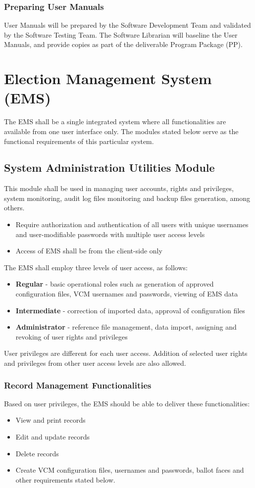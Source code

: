 \documentclass[a4paper, 11pt]{article}
\begin{document}
\subsubsection{Preparing User Manuals}
User Manuals will be prepared by the Software Development Team and validated by the Software Testing Team. The Software Librarian will baseline the User Manuals, and provide copies as part of the deliverable Program Package (PP).

\section{Election Management System (EMS)}\label{ems}
The EMS shall be a single integrated system where all functionalities are available from one user interface only. The modules stated below serve as the functional requirements of this particular system.
\subsection{System Administration Utilities Module}
This module shall be used in managing user accounts, rights and privileges, system monitoring, audit log files monitoring and backup files generation, among others.
\begin{itemize}
	\item Require authorization and authentication of all users with unique usernames and user-modifiable passwords with multiple user access levels
	\item Access of EMS shall be from the client-side only
\end{itemize}
The EMS shall employ three levels of user access, as follows:
\begin{itemize}
	\item \textbf{Regular} - basic operational roles such as generation of approved configuration files, VCM usernames and passwords, viewing of EMS data
	\item \textbf{Intermediate} - correction of imported data, approval of configuration files
	\item \textbf{Administrator} - reference file management, data import, assigning and revoking of user rights and privileges
\end{itemize}
User privileges are different for each user access. Addition of selected user rights and privileges from other user access levels are also allowed.
\subsubsection{Record Management Functionalities}
Based on user privileges, the EMS should be able to deliver these functionalities:
\begin{itemize}
	\item View and print records
	\item Edit and update records
	\item Delete records
	\item Create VCM configuration files, usernames and passwords, ballot faces and other requirements stated below.
\end{itemize}
\end{document}
